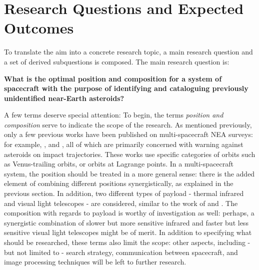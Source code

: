 \newpage

\section{Research Questions and Expected Outcomes}
\label{sec:researchquestions}

To translate the aim into a concrete research topic, a main research question and a set of derived subquestions is composed. The main research question is:

\begin{center}\large\textbf{What is the optimal position and composition for a system of spacecraft with the purpose of identifying and cataloguing previously unidentified near-Earth asteroids?}\end{center}

A few terms deserve special attention: To begin, the terms \textit{position and composition} serve to indicate the scope of the research. As mentioned previously, only a few previous works have been published on multi-spacecraft NEA surveys: for example, \cite{ThesisOlga}, \cite{LagrangeNEA} and \cite{newasteroidpaper}, all of which are primarily concerned with warning against asteroids on impact trajectories. These works use specific categories of orbits such as Venus-trailing orbits, or orbits at Lagrange points. In a multi-spacecraft system, the position should be treated in a more general sense: there is the added element of combining different positions synergistically, as explained in the previous section. In addition, two different types of payload - thermal infrared and visual light telescopes - are considered, similar to the work of \cite{2017NEOSDT} and \cite{ThesisOlga}. The composition with regards to payload is worthy of investigation as well: perhaps, a synergistic combination of slower but more sensitive infrared and faster but less sensitive visual light telescopes might be of merit. In addition to specifying what should be researched, these terms also limit the scope: other aspects, including - but not limited to - search strategy, communication between spacecraft, and image processing techniques will be left to further research. \\

